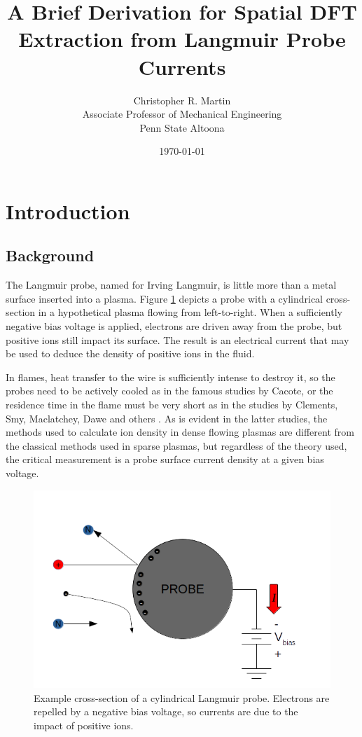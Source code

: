 \documentclass{article}
\title{A Brief Derivation for Spatial DFT Extraction from Langmuir Probe Currents}
\author{Christopher R. Martin\\Associate Professor of Mechanical Engineering\\Penn State Altoona}
\date{\today}
\begin{document}
\maketitle

\section{Introduction}

\subsection{Background}

The Langmuir probe, named for Irving Langmuir, is little more than a metal surface inserted into a plasma.  Figure \ref{fig:probe} depicts a probe with a cylindrical cross-section in a hypothetical plasma flowing from left-to-right.  When a sufficiently negative bias voltage is applied, electrons are driven away from the probe, but positive ions still impact its surface.  The result is an electrical current that may be used to deduce the density of positive ions in the fluid.  

In flames, heat transfer to the wire is sufficiently intense to destroy it, so the probes need to be actively cooled as in the famous studies by Cacote\cite{}, or the residence time in the flame must be very short as in the studies by Clements, Smy, Maclatchey, Dawe and others \cite{}.  As is evident in the latter studies, the methods used to calculate ion density in dense flowing plasmas are different from the classical methods used in sparse plasmas, but regardless of the theory used, the critical measurement is a probe surface current density at a given bias voltage.

\begin{figure}
\centering
\includegraphics[width=0.97\linewidth]{figures/probe}
\caption{Example cross-section of a cylindrical Langmuir probe.  Electrons are repelled by a negative bias voltage, so currents are due to the impact of positive ions.}\label{fig:probe}
\end{figure}
\end{document}
